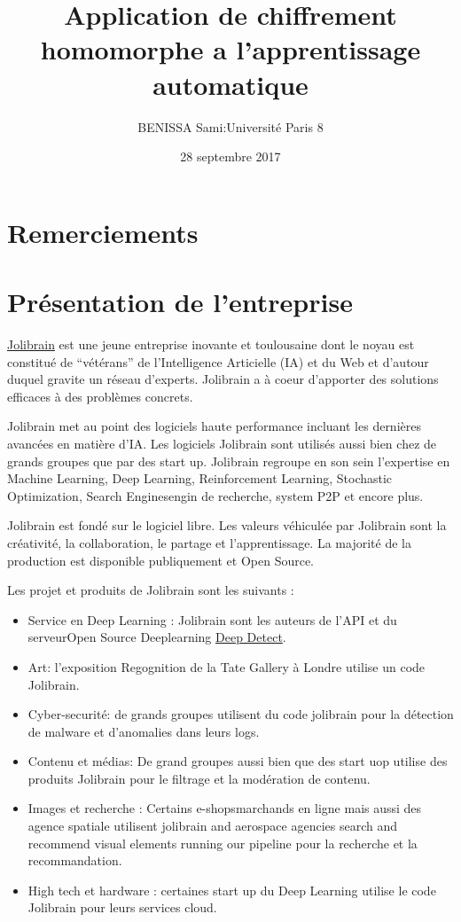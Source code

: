 \documentclass[a4paper,12pt]{article}
\title{Application de chiffrement homomorphe a l'apprentissage automatique}
\author{BENISSA Sami\quad:\quad Université Paris 8}
\date{28 septembre 2017}
\begin{document}
\maketitle
\newpage
\renewcommand{\chaptername}{}
\tableofcontents

\newpage
\section*{Remerciements}
\newpage
\section{Présentation de l’entreprise}
\href{http://jolibrain.com/}{Jolibrain} est une jeune entreprise inovante et toulousaine dont le noyau est constitué de ``vétérans'' de l'Intelligence Articielle (IA) et du Web et d'autour duquel gravite un réseau d'experts.
Jolibrain a à coeur d'apporter des solutions efficaces à des problèmes concrets.

Jolibrain met au point des logiciels haute performance incluant les dernières avancées en matière d'IA. Les logiciels Jolibrain sont utilisés aussi bien chez de grands groupes que par des start up. Jolibrain regroupe en son sein l'expertise en  Machine Learning, Deep Learning, Reinforcement Learning, Stochastic Optimization, Search Enginesengin de recherche, system P2P et encore plus.

Jolibrain est fondé sur le logiciel libre. Les valeurs véhiculée par Jolibrain sont la créativité, la collaboration, le  partage et l'apprentissage. La majorité de la production est disponible publiquement et Open Source.

Les projet et produits de Jolibrain sont les suivants :
\begin{itemize}
\item   Service en Deep Learning :
  Jolibrain sont les auteurs de l'API  et du serveurOpen Source Deeplearning \href{https://github.com/beniz/deepdetect}{Deep Detect}.
\item Art: l'exposition Regognition de la Tate Gallery à Londre utilise un code Jolibrain.
\item
Cyber-securité: de grands groupes utilisent du code jolibrain pour la détection de malware et d'anomalies dans leurs logs.
\item
Contenu et médias: De grand groupes aussi bien que des start uop utilise des produits Jolibrain pour le filtrage et la modération de contenu.
\item
Images et recherche : Certains e-shopsmarchands en ligne mais aussi des agence spatiale utilisent jolibrain and aerospace agencies search and recommend visual elements running our pipeline pour la recherche et la recommandation.
\item
High tech et hardware : certaines start up du Deep Learning utilise le code Jolibrain pour leurs services cloud.
\end{itemize}
\end{document}
